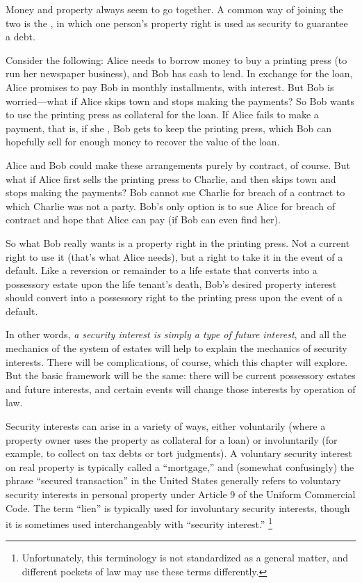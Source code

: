 Money and property always seem to go together. A common way of joining the
two is the , in which one person's property right is
used as security to guarantee a debt.

Consider the following: Alice needs to borrow money to buy a printing press (to
run her newspaper business), and Bob has cash to lend. In exchange for the
loan, Alice promises to pay Bob in monthly installments, with interest. But Bob
is worried---what if Alice skips town and stops making the payments? So Bob
wants to use the printing press as collateral for the loan. If Alice fails to
make a payment, that is, if she , Bob gets to keep the
printing press, which Bob can hopefully sell for enough money to recover the
value of the loan.


Alice and Bob could make these arrangements purely by contract, of course. But
what if Alice first sells the printing press to Charlie, and then skips town and
stops making the payments? Bob cannot sue Charlie for breach of a contract to
which Charlie was not a party. Bob's only option is to sue Alice for breach of
contract and hope that Alice can pay (if Bob can even find her).

So what Bob really wants is a property right in the printing press. Not a
current right to use it (that's what Alice needs), but a right to take it in the
event of a default. Like a reversion or remainder to a life estate that converts
into a possessory estate upon the life tenant's death, Bob's desired property
interest should convert into a possessory right to the printing press upon the
event of a default.

In other words, \emph{a security interest is simply a type of future interest},
and all the mechanics of the system of estates will help to explain the
mechanics of security interests. There will be complications, of course, which
this chapter will explore. But the basic framework will be the same: there will
be current possessory estates and future interests, and certain events will
change those interests by operation of law.

Security interests can arise in a variety of ways, either voluntarily (where a
property owner uses the property as collateral for a loan) or involuntarily
(for example, to collect on tax debts or tort judgments). A voluntary security
interest on real property is typically called a ``mortgage,'' and (somewhat
confusingly) the phrase ``secured transaction'' in the United States generally
refers to voluntary security interests in personal property under Article 9 of
the Uniform Commercial Code. The term ``lien'' is typically used for involuntary
security interests, though it is sometimes used interchangeably with ``security
interest.'' \unskip\footnote{Unfortunately, this terminology is not standardized
as a general matter, and different pockets of law may use these terms
differently.}

